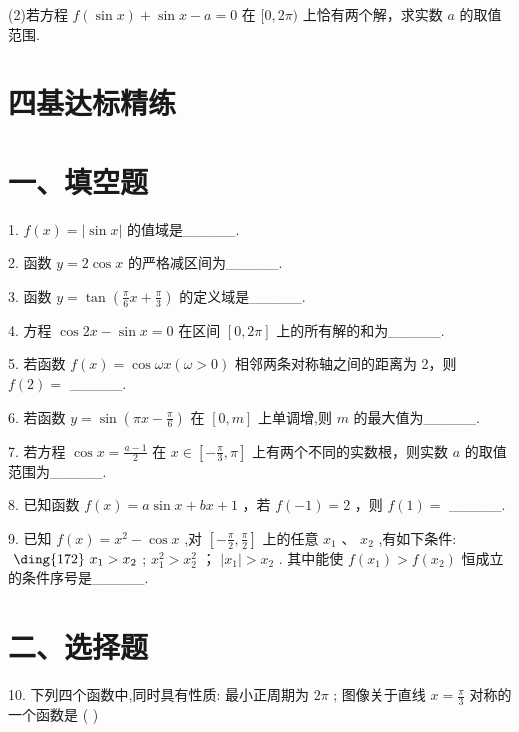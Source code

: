 (2)若方程 $f\left( {\sin x}\right)  + \sin x - a = 0$ 在 $\lbrack 0,{2\pi })$ 上恰有两个解，求实数 $a$ 的取值范围.

\section*{四基达标精练}

\section*{一、填空题}

1. $f\left( x\right)  = \left| {\sin x}\right|$ 的值域是\_\_\_\_\_.

2. 函数 $y = 2\cos x$ 的严格减区间为\_\_\_\_\_.

3. 函数 $y = \tan \left( {\frac{\pi }{6}x + \frac{\pi }{3}}\right)$ 的定义域是\_\_\_\_\_.

4. 方程 $\cos {2x} - \sin x = 0$ 在区间 $\left\lbrack  {0,{2\pi }}\right\rbrack$ 上的所有解的和为\_\_\_\_\_.

5. 若函数 $f\left( x\right)  = \cos {\omega x}\left( {\omega  > 0}\right)$ 相邻两条对称轴之间的距离为 2，则 $f\left( 2\right)  =$ \_\_\_\_\_.

6. 若函数 $y = \sin \left( {{\pi x} - \frac{\pi }{6}}\right)$ 在 $\left\lbrack  {0,m}\right\rbrack$ 上单调增,则 $m$ 的最大值为\_\_\_\_\_.

7. 若方程 $\cos x = \frac{a - 1}{2}$ 在 $x \in  \left\lbrack  {-\frac{\pi }{3},\pi }\right\rbrack$ 上有两个不同的实数根，则实数 $a$ 的取值范围为\_\_\_\_\_.

8. 已知函数 $f\left( x\right)  = a\sin x + {bx} + 1$ ，若 $f\left( {-1}\right)  = 2$ ，则 $f\left( 1\right)  =$ \_\_\_\_\_.

9. 已知 $f\left( x\right)  = {x}^{2} - \cos x$ ,对 $\left\lbrack  {-\frac{\pi }{2},\frac{\pi }{2}}\right\rbrack$ 上的任意 ${x}_{1}\text{ 、 }{x}_{2}$ ,有如下条件: $\text{  \ding{172}  }{x}_{1} > {x}_{2}$ ;    ${x}_{1}^{2} > {x}_{2}^{2}$ ；   $\left| {x}_{1}\right|  > {x}_{2}$ . 其中能使 $f\left( {x}_{1}\right)  > f\left( {x}_{2}\right)$ 恒成立的条件序号是\_\_\_\_\_.

\section*{二、选择题}

10. 下列四个函数中,同时具有性质:    最小正周期为 ${2\pi }$ ;    图像关于直线 $x = \frac{\pi }{3}$ 对称的一个函数是 ( )

